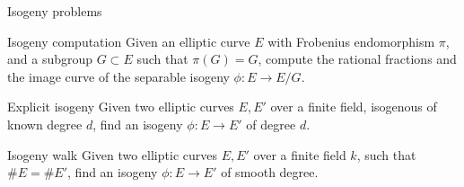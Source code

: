 \documentclass{beamer}
\begin{document}

\begin{frame}{Isogeny problems}
  \begin{block}{Isogeny computation\hfill{}}
    Given an elliptic curve $E$ with Frobenius endomorphism $\pi$, and
    a subgroup $G\subset E$ such that $\pi(G)=G$, compute the rational
    fractions and the image curve of the separable isogeny
    $\phi:E\to E/G$.
  \end{block}

  \begin{block}{Explicit isogeny\hfill{}}
    Given two elliptic curves $E,E'$ over a finite field, isogenous of
    known degree $d$, find an isogeny $\phi:E\to E'$ of degree $d$.
  \end{block}

  \begin{block}{Isogeny walk\hfill{}}
    Given two elliptic curves $E,E'$ over a finite field $k$, such
    that $\#E=\#E'$, find an isogeny $\phi:E\to E'$ of smooth degree.
  \end{block}
\end{frame}

\end{document}
